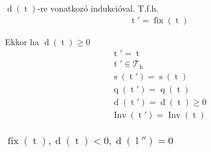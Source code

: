 \documentclass{article}
\newcommand*{\Trees}{\ensuremath{\mathcal{T}}}
\newcommand*{\fFix}{\ensuremath{\operatorname{fix}}}
\newcommand*{\fInv}{\ensuremath{\operatorname{Inv}}}
\newcommand*{\sDiff}[1]{\ensuremath{\operatorname{d}\left(#1\right)}}
\newcommand*{\sPosition}[1]{\ensuremath{\operatorname{q}\left(#1\right)}}
\newcommand*{\sPrimes}[1]{\ensuremath{\operatorname{s}\left(#1\right)}}
\newcommand*{\vH}{\ensuremath{\operatorname{h}}}
\newcommand*{\vL}{\ensuremath{\operatorname{l}}}
\newcommand*{\vT}{\ensuremath{\operatorname{t}}}
\begin{document}
$\sDiff{\vT}$-re vonatkozó indukcióval. T.f.h.
\begin{align*}
\vT' = \fFix(\vT)
\end{align*}

Ekkor ha $ \sDiff{\vT} \ge 0 $
\begin{align*}
\vT' = \vT \\
\vT' \in \Trees_{\vH} \tag{F1} \\
\sPrimes{\vT'} = \sPrimes{\vT} \tag{F2} \\
\sPosition{\vT'} = \sPosition{\vT} \tag{F3} \\
\sDiff{\vT'} = \sDiff{\vT} \ge 0 \tag{F4} \\
\fInv(\vT') = \fInv(\vT) \tag{F5}
\end{align*}

\subsubsection{$ \fFix(\vT), \sDiff{\vT} < 0, \sDiff{\vL''} = 0 $}
\end{document}
